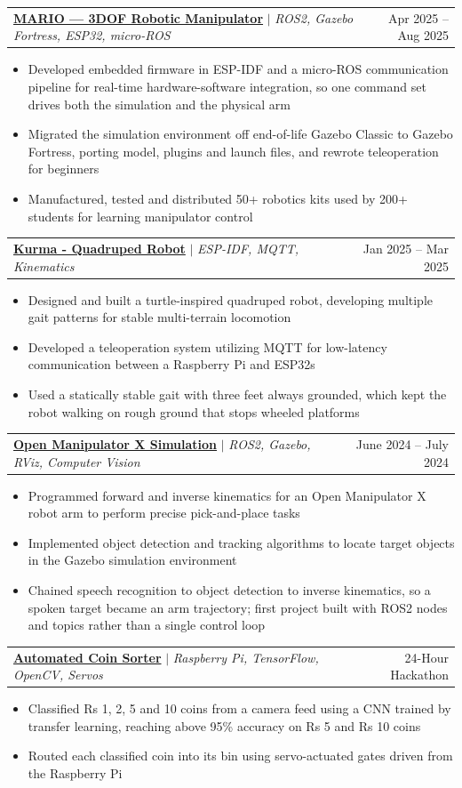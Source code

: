 \documentclass[a4paper,11pt]{article}
\makeatletter
\newcommand{\resumeItem}[1]{
  \item\small{
    {#1 \vspace{-2pt}}
  }
}
\newcommand{\resumeProjectHeading}[2]{
    \item
    \begin{tabular*}{0.97\textwidth}{l@{\extracolsep{\fill}}r}
      \small#1 & #2 \\
    \end{tabular*}\vspace{-7pt}
}
\newcommand{\resumeItemListStart}{\begin{itemize}}
\newcommand{\resumeItemListEnd}{\end{itemize}\vspace{-7pt}}
\makeatother
\begin{document}
    \resumeProjectHeading
      {\textbf{\href{https://spongefal.vercel.app/projects/mario/}{MARIO — 3DOF Robotic Manipulator}} $|$ \emph{ROS2, Gazebo Fortress, ESP32, micro-ROS}}{Apr 2025 -- Aug 2025}
      \resumeItemListStart
        \resumeItem{Developed embedded firmware in ESP-IDF and a micro-ROS communication pipeline for real-time hardware-software integration, so one command set drives both the simulation and the physical arm}
        \resumeItem{Migrated the simulation environment off end-of-life Gazebo Classic to Gazebo Fortress, porting model, plugins and launch files, and rewrote teleoperation for beginners}
        \resumeItem{Manufactured, tested and distributed 50+ robotics kits used by 200+ students for learning manipulator control}
      \resumeItemListEnd

    \resumeProjectHeading
      {\textbf{\href{https://spongefal.vercel.app/projects/kurma/}{Kurma - Quadruped Robot}} $|$ \emph{ESP-IDF, MQTT, Kinematics}}{Jan 2025 -- Mar 2025}
      \resumeItemListStart
        \resumeItem{Designed and built a turtle-inspired quadruped robot, developing multiple gait patterns for stable multi-terrain locomotion}
        \resumeItem{Developed a teleoperation system utilizing MQTT for low-latency communication between a Raspberry Pi and ESP32s}
        \resumeItem{Used a statically stable gait with three feet always grounded, which kept the robot walking on rough ground that stops wheeled platforms}
      \resumeItemListEnd

    \resumeProjectHeading
      {\textbf{\href{https://spongefal.vercel.app/projects/vvm/}{Open Manipulator X Simulation}} $|$ \emph{ROS2, Gazebo, RViz, Computer Vision}}{June 2024 -- July 2024}
      \resumeItemListStart
        \resumeItem{Programmed forward and inverse kinematics for an Open Manipulator X robot arm to perform precise pick-and-place tasks}
        \resumeItem{Implemented object detection and tracking algorithms to locate target objects in the Gazebo simulation environment}
        \resumeItem{Chained speech recognition to object detection to inverse kinematics, so a spoken target became an arm trajectory; first project built with ROS2 nodes and topics rather than a single control loop}
      \resumeItemListEnd

    \resumeProjectHeading
      {\textbf{\href{https://github.com/NoobMaster-version/Coin_Detection}{Automated Coin Sorter}} $|$ \emph{Raspberry Pi, TensorFlow, OpenCV, Servos}}{24-Hour Hackathon}
      \resumeItemListStart
        \resumeItem{Classified Rs 1, 2, 5 and 10 coins from a camera feed using a CNN trained by transfer learning, reaching above 95\% accuracy on Rs 5 and Rs 10 coins}
        \resumeItem{Routed each classified coin into its bin using servo-actuated gates driven from the Raspberry Pi}
      \resumeItemListEnd
\end{document}
